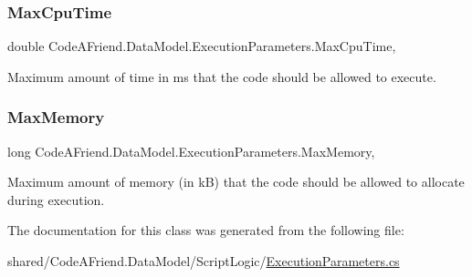 \subsubsection{\texorpdfstring{Max\+Cpu\+Time}{MaxCpuTime}}
{\footnotesize\ttfamily double Code\+A\+Friend.\+Data\+Model.\+Execution\+Parameters.\+Max\+Cpu\+Time\hspace{0.3cm}{\ttfamily [get]}, {\ttfamily [set]}}



Maximum amount of time in ms that the code should be allowed to execute. 

\mbox{\label{class_code_a_friend_1_1_data_model_1_1_execution_parameters_a8fa68ab9aabe8993245a26541d2256c6}} 
\subsubsection{\texorpdfstring{Max\+Memory}{MaxMemory}}
{\footnotesize\ttfamily long Code\+A\+Friend.\+Data\+Model.\+Execution\+Parameters.\+Max\+Memory\hspace{0.3cm}{\ttfamily [get]}, {\ttfamily [set]}}



Maximum amount of memory (in kB) that the code should be allowed to allocate during execution. 



The documentation for this class was generated from the following file\+:\begin{DoxyCompactItemize}
\item 
shared/\+Code\+A\+Friend.\+Data\+Model/\+Script\+Logic/\mbox{\hyperlink{_execution_parameters_8cs}{Execution\+Parameters.\+cs}}\end{DoxyCompactItemize}
